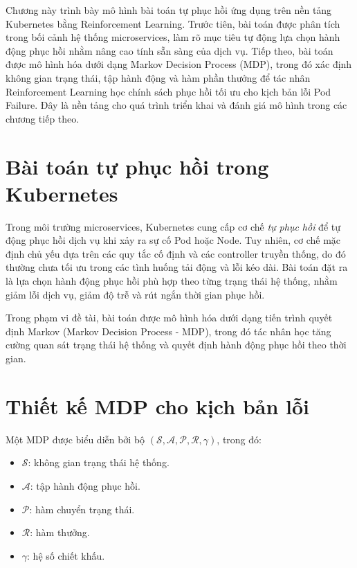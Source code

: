 Chương này trình bày mô hình bài toán tự phục hồi ứng dụng trên 
nền tảng Kubernetes bằng Reinforcement Learning. Trước tiên, bài 
toán được phân tích trong bối cảnh hệ thống microservices, làm rõ mục 
tiêu tự động lựa chọn hành động phục hồi nhằm nâng cao tính sẵn sàng 
của dịch vụ. Tiếp theo, bài toán được mô hình hóa dưới dạng Markov 
Decision Process (MDP), trong đó xác định không gian trạng thái, 
tập hành động và hàm phần thưởng để tác nhân Reinforcement Learning 
học chính sách phục hồi tối ưu cho kịch bản lỗi Pod Failure. Đây là 
nền tảng cho quá trình triển khai và đánh giá mô hình trong các chương 
tiếp theo.

\section{Bài toán tự phục hồi trong Kubernetes}

\noindent Trong môi trường microservices, Kubernetes cung cấp cơ chế \textit{tự phục hồi} để tự động phục hồi dịch vụ khi xảy ra sự cố Pod hoặc Node. Tuy nhiên, cơ chế mặc định chủ yếu dựa trên các quy tắc cố định và các controller truyền thống, do đó thường chưa tối ưu trong các tình huống tải động và lỗi kéo dài. Bài toán đặt ra là lựa chọn hành động phục hồi phù hợp theo từng trạng thái hệ thống, nhằm giảm lỗi dịch vụ, giảm độ trễ và rút ngắn thời gian phục hồi.

\noindent Trong phạm vi đề tài, bài toán được mô hình hóa dưới dạng tiến trình quyết định Markov (Markov Decision Process - MDP), trong đó tác nhân học tăng cường quan sát trạng thái hệ thống và quyết định hành động phục hồi theo thời gian.

\section{Thiết kế MDP cho kịch bản lỗi}

\noindent Một MDP được biểu diễn bởi bộ $(\mathcal{S}, \mathcal{A}, \mathcal{P}, \mathcal{R}, \gamma)$, trong đó:
\begin{itemize}
    \item $\mathcal{S}$: không gian trạng thái hệ thống.
    \item $\mathcal{A}$: tập hành động phục hồi.
    \item $\mathcal{P}$: hàm chuyển trạng thái.
    \item $\mathcal{R}$: hàm thưởng.
    \item $\gamma$: hệ số chiết khấu.
\end{itemize}

